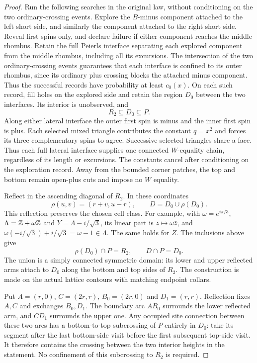 \begin{proof}
Run the following searches in the original law, without conditioning
on the two ordinary-crossing events.  Explore the $B$-minus component
attached to the left short side, and similarly the component attached
to the right short side.  Reveal first spins only, and declare failure
if either component reaches the middle rhombus. Retain the full Peierls interface
separating each explored component from the middle rhombus, including
all its excursions. The intersection of the two ordinary-crossing events guarantees that
each interface is confined to its outer rhombus, since its ordinary
plus crossing blocks the attached minus component.  Thus the successful
records have probability at least $c_0(x)$.  On each such record, fill
holes on the explored side and retain the region $D_0$
between the two interfaces. Its interior is unobserved, and
\[
                 R_2\subseteq D_0\subseteq P.
\]
Along either lateral interface the outer first spin is minus and the
inner first spin is plus. Each selected mixed triangle contributes the
constant $q=x^2$ and forces its three complementary spins to agree.
Successive selected triangles share a face. Thus each full lateral
interface supplies one connected $W$-equality chain, regardless of its
length or excursions. The constants cancel after conditioning on the
exploration record. Away from the bounded corner patches, the top and
bottom remain open-plus cuts and impose no $W$ equality.

Reflect in the ascending diagonal of $R_2$. In these coordinates
\[
 \rho(u,v)=(r+v,u-r),\qquad D=D_0\cup\rho(D_0).
\]
This reflection preserves the chosen cell class. For example, with
$\omega=e^{i\pi/3}$, $\Lambda=\mathbb Z+\omega\mathbb Z$ and
$Y=\Lambda-i/\sqrt3$, its linear part is $z\mapsto\omega\bar z$,
and $\omega\overline{(-i/\sqrt3)}+i/\sqrt3=\omega-1\in\Lambda$.
The same holds for $Z$. The inclusions above give
\[
 \rho(D_0)\cap P=R_2,\qquad D\cap P=D_0.
\]
The union is a simply connected symmetric domain: its lower and upper
reflected arms attach to $D_0$ along the bottom and top sides of $R_2$.
The construction is made on the actual lattice contours with matching
endpoint collars.

Put $A=(r,0)$, $C=(2r,r)$, $B_0=(2r,0)$ and $D_1=(r,r)$.
Reflection fixes $A,C$ and exchanges $B_0,D_1$. The boundary arc
$AB_0$ surrounds the lower reflected arm, and $CD_1$ surrounds the
upper one. Any occupied site connection between these two arcs has a
bottom-to-top subcrossing of $P$ entirely in $D_0$: take its segment
after the last bottom-side visit before the first subsequent top-side
visit. It therefore contains the crossing between the two interior
heights in the statement. No confinement of this subcrossing to $R_2$
is required.


\end{proof}
